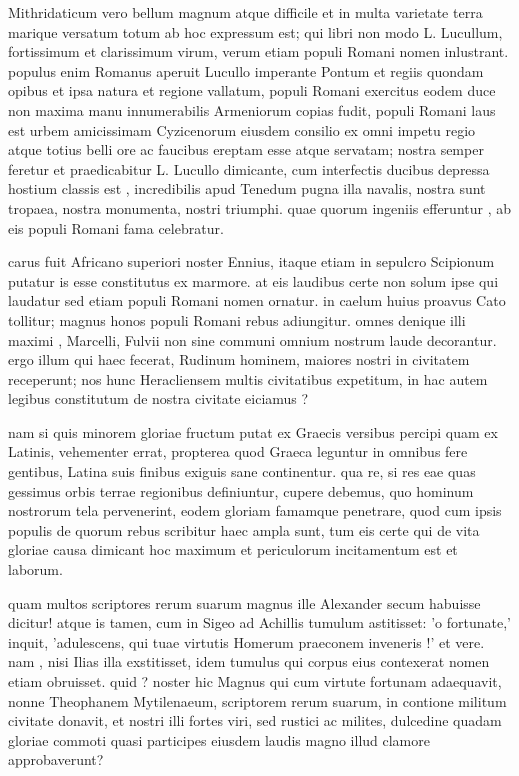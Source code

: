  Mithridaticum vero bellum magnum atque difficile et in multa varietate terra marique versatum totum ab hoc expressum est; qui libri non modo L. Lucullum, fortissimum et clarissimum virum, verum etiam populi Romani nomen inlustrant. populus enim Romanus aperuit Lucullo imperante Pontum et regiis quondam opibus et ipsa natura et regione vallatum, populi Romani exercitus eodem duce non maxima manu innumerabilis Armeniorum copias fudit, populi Romani laus est urbem amicissimam Cyzicenorum eiusdem consilio ex omni impetu regio atque totius belli ore ac faucibus ereptam esse atque servatam; nostra semper feretur et praedicabitur L. Lucullo dimicante, cum interfectis ducibus depressa hostium classis est , incredibilis apud Tenedum pugna illa navalis, nostra sunt tropaea, nostra monumenta, nostri triumphi. quae quorum ingeniis efferuntur , ab eis populi Romani fama celebratur.

 carus fuit Africano superiori noster Ennius, itaque etiam in sepulcro Scipionum putatur is esse constitutus ex marmore. at eis laudibus certe non solum ipse qui laudatur sed etiam populi Romani nomen ornatur. in caelum huius proavus Cato tollitur; magnus honos populi Romani rebus adiungitur. omnes denique illi maximi , Marcelli, Fulvii non sine communi omnium nostrum laude decorantur. ergo illum qui haec fecerat, Rudinum hominem, maiores nostri in civitatem receperunt; nos hunc Heracliensem multis civitatibus expetitum, in hac autem legibus constitutum de nostra civitate eiciamus ?

 nam si quis minorem gloriae fructum putat ex Graecis versibus percipi quam ex Latinis, vehementer errat, propterea quod Graeca leguntur in omnibus fere gentibus, Latina suis finibus exiguis sane continentur. qua re, si res eae quas gessimus orbis terrae regionibus definiuntur, cupere debemus, quo hominum nostrorum tela pervenerint, eodem gloriam famamque penetrare, quod cum ipsis populis de quorum rebus scribitur haec ampla sunt, tum eis certe qui de vita gloriae causa dimicant hoc maximum et periculorum incitamentum est et laborum.

 quam multos scriptores rerum suarum magnus ille Alexander secum habuisse dicitur! atque is tamen, cum in Sigeo ad Achillis tumulum astitisset: 'o fortunate,' inquit, 'adulescens, qui tuae virtutis Homerum praeconem inveneris !' et vere. nam , nisi Ilias illa exstitisset, idem tumulus qui corpus eius contexerat nomen etiam obruisset. quid ? noster hic Magnus qui cum virtute fortunam adaequavit, nonne Theophanem Mytilenaeum, scriptorem rerum suarum, in contione militum civitate donavit, et nostri illi fortes viri, sed rustici ac milites, dulcedine quadam gloriae commoti quasi participes eiusdem laudis magno illud clamore approbaverunt?

